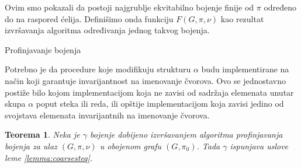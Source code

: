 \documentclass[12pt,oneside]{memoir}
\newtheorem{theorem}{Teorema}
\theoremstyle{definition}
\begin{document}
  
  Ovim smo pokazali da postoji najgrublje ekvitabilno bojenje finije od $\pi$
  određeno do na raspored ćelija. Definišimo onda funkciju $F(G, \pi, \nu)$ kao
  rezultat izvršavanja algoritma određivanja jednog takvog bojenja.

  \begin{algorithm}[H]
	  \caption{Profinjavanje bojenja}
	  \begin{algorithmic}[1]
		  \State {$\alpha \gets \emptyset$}
		  \Else
		  \EndIf
		  \While{$\alpha \neq \emptyset$}
			  \Else
			  \EndIf
			\EndFor
		  \EndWhile
		  \State \Return{$\pi$}
		  \EndProcedure
	  \end{algorithmic}
  \end{algorithm}

  Potrebno je da procedure koje modifikuju strukturu $\alpha$ budu
  implementirane na način koji garantuje invarijantnost na imenovanje čvorova.
  Ovo se jednostavno postiže bilo kojom implementacijom koja ne zavisi od
  sadržaja elemenata unutar skupa $\alpha$ poput steka ili reda, ili opštije
  implementacijom koja zavisi jedino od svojstava elemenata invarijantnih
  na imenovanje čvorova.

  \begin{theorem}
	  Neka je $\gamma$ bojenje dobijeno izvršavanjem algoritma profinjavanja
	  bojenja za ulaz $(G, \pi, \nu)$ u obojenom grafu $(G, \pi_0)$. Tada
	  $\gamma$ ispunjava uslove leme \ref{lemma:coarsesteq}.
  \end{theorem}
\end{document}
